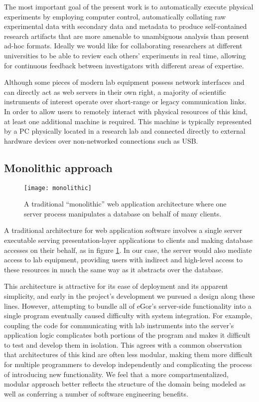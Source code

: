 \documentclass[../thesis]{subfiles}
\begin{document}
The most important goal of the present work is to automatically
execute physical experiments by employing computer control,
automatically collating raw experimental data with secondary data and
metadata to produce self-contained research artifacts that are more
amenable to unambiguous analysis than present ad-hoc formats.
Ideally we would like for collaborating researchers at different
universities to be able to review each others' experiments in real
time, allowing for continuous feedback between investigators with
different areas of expertise.

Although some pieces of modern lab equipment possess network interfaces
and can directly act as web servers in their own right, a majority of
scientific instruments of interest operate over short-range or legacy
communication links. In order to allow users to remotely interact with
physical resources of this kind, at least one additional machine is
required. This machine is typically represented by a PC physically
located in a research lab and connected directly to external hardware
devices over non-networked connections such as USB.

\subsection{Monolithic approach}
\begin{figure}
  \texttt{[image: monolithic]}
  \caption{
    A traditional ``monolithic'' web application architecture where
    one server process manipulates a database on behalf of many clients.
    \label{fig:Monolithic}
  }
\end{figure}

A traditional architecture for web application software involves a
single server executable serving presentation-layer applications to
clients and making database accesses on their behalf, as in figure
\ref{fig:Monolithic}. In our case, the server would also mediate
access to lab equipment, providing users with indirect and high-level
access to these resources in much the same way as it abstracts over
the database.

This architecture is attractive for its ease of deployment and its
apparent simplicity, and early in the project's development we pursued
a design along these lines. However, attempting to bundle all of
eGor's server-side functionality into a single program eventually
caused difficulty with system integration. For example, coupling the
code for communicating with lab instruments into the server's
application logic complicates both portions of the program and makes
it difficult to test and develop them in isolation. This agrees with a
common observation \cite{Stephens:2015:BSE:2826034} that architectures
of this kind are often less modular, making them more difficult for
multiple programmers to develop independently and complicating the
process of introducing new functionality. We feel that a more
compartmentalized, modular approach better reflects the structure of
the domain being modeled as well as conferring a number of software
engineering benefits.
\end{document}
